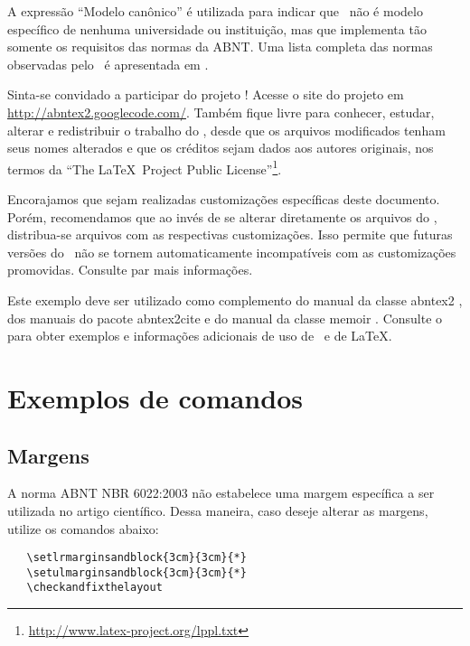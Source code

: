 \documentclass[
	article,			%
	11pt,				%
	oneside,			%
	a4paper,			%
	english,			%
	brazil,				%
	sumario=tradicional
	]{abntex2}
\begin{document}
A expressão ``Modelo canônico'' é utilizada para indicar que \abnTeX\ não é
modelo específico de nenhuma universidade ou instituição, mas que implementa tão
somente os requisitos das normas da ABNT. Uma lista completa das normas
observadas pelo \abnTeX\ é apresentada em .

Sinta-se convidado a participar do projeto \abnTeX! Acesse o site do projeto em
\url{http://abntex2.googlecode.com/}. Também fique livre para conhecer,
estudar, alterar e redistribuir o trabalho do \abnTeX, desde que os arquivos
modificados tenham seus nomes alterados e que os créditos sejam dados aos
autores originais, nos termos da ``The \LaTeX\ Project Public
License''\footnote{\url{http://www.latex-project.org/lppl.txt}}.

Encorajamos que sejam realizadas customizações específicas deste documento.
Porém, recomendamos que ao invés de se alterar diretamente os arquivos do
\abnTeX, distribua-se arquivos com as respectivas customizações. Isso permite
que futuras versões do \abnTeX~não se tornem automaticamente incompatíveis com
as customizações promovidas. Consulte 
par mais informações.

Este exemplo deve ser utilizado como complemento do manual da classe
\textsf{abntex2} \cite{abntex2classe}, dos manuais do pacote
\textsf{abntex2cite} \cite{abntex2cite,abntex2cite-alf} e do manual da classe
\textsf{memoir} \cite{memoir}. Consulte o  para obter
exemplos e informações adicionais de uso de \abnTeX\ e de \LaTeX.

\section{Exemplos de comandos}

\subsection{Margens}

A norma ABNT NBR 6022:2003 não estabelece uma margem específica a ser utilizada
no artigo científico. Dessa maneira, caso deseje alterar as margens, utilize os
comandos abaixo:

\begin{verbatim}
   \setlrmarginsandblock{3cm}{3cm}{*}
   \setulmarginsandblock{3cm}{3cm}{*}
   \checkandfixthelayout
\end{verbatim}
\end{document}
